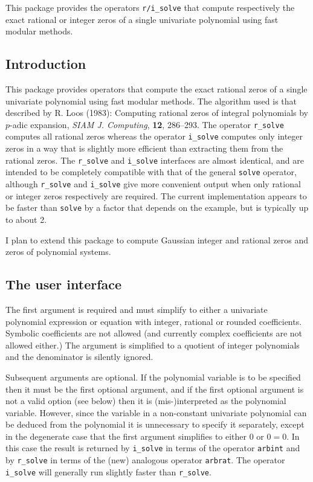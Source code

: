 
  This package provides the operators \verb|r/i_solve| that compute
  respectively the exact rational or integer zeros of a single
  univariate polynomial using fast modular methods.


\subsection{Introduction}

This package provides operators that compute the exact rational zeros
of a single univariate polynomial using fast modular methods.  The
algorithm used is that described by R. Loos (1983): Computing rational
zeros of integral polynomials by $p$-adic expansion, {\it SIAM J.
Computing}, {\bf 12}, 286--293.  The operator \verb|r_solve| computes
all rational zeros whereas the operator \verb|i_solve| computes only
integer zeros in a way that is slightly more efficient than extracting
them from the rational zeros.  The \verb|r_solve| and \verb|i_solve|
interfaces are almost identical, and are intended to be completely
compatible with that of the general \verb|solve| operator, although
\verb|r_solve| and \verb|i_solve| give more convenient output when
only rational or integer zeros respectively are required.  The current
implementation appears to be faster than \verb|solve| by a factor that
depends on the example, but is typically up to about 2.
  
I plan to extend this package to compute Gaussian integer and rational
zeros and zeros of polynomial systems.


\subsection{The user interface}

The first argument is required and must simplify to either a
univariate polynomial expression or equation with integer, rational or
rounded coefficients.  Symbolic coefficients are not allowed (and
currently complex coefficients are not allowed either.)  The argument
is simplified to a quotient of integer polynomials and the denominator
is silently ignored.
  
Subsequent arguments are optional.  If the polynomial variable is to
be specified then it must be the first optional argument, and if the
first optional argument is not a valid option (see below) then it is
(mis-)interpreted as the polynomial variable.  However, since the
variable in a non-constant univariate polynomial can be deduced from
the polynomial it is unnecessary to specify it separately, except in
the degenerate case that the first argument simplifies to either 0 or
$0 = 0$.  In this case the result is returned by \verb|i_solve| in
terms of the operator \verb|arbint| and by \verb|r_solve| in terms of
the (new) analogous operator \verb|arbrat|.  The operator
\verb|i_solve| will generally run slightly faster than \verb|r_solve|.
  
